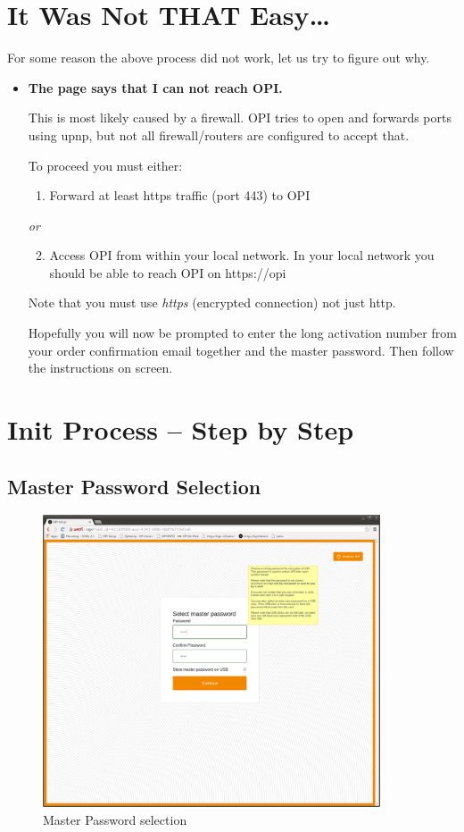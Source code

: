 \documentclass[12pt,a4paper,titlepage]{article}
\begin{document}
\newpage
\section{It Was Not THAT Easy\ldots}
For some reason the above process did not work, let us try to figure out why.
\begin{itemize}
\item \textbf{The page says that I can not reach OPI.}

This is most likely caused by a firewall. OPI tries to open and forwards ports using upnp, but not all firewall/routers are configured to accept that.

To proceed you must either:
\begin{enumerate}
\item Forward at least https traffic (port 443) to OPI
\end{enumerate}
\emph{or}
\begin{enumerate}
\setcounter{enumi}{1}
\item Access OPI from within your local network. In your local network you should be able to reach OPI on https://opi
\end{enumerate}

Note that you must use \emph{https} (encrypted connection) not just http.

Hopefully you will now be prompted to enter the long activation number from your order confirmation email together and the master password.
Then follow the instructions on screen.
\end{itemize}
\newpage
\section{Init Process – Step by Step}
\subsection{Master Password Selection}
\begin{figure}[h]
\centering
\includegraphics[width=10cm]{./img/master_pwd}
\caption{Master Password selection}
\end{figure}
\end{document}
